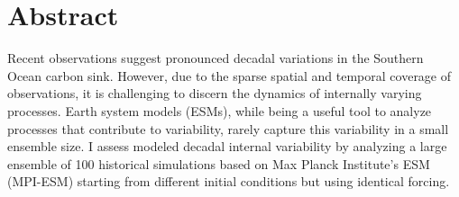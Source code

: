 
\chapter*{Abstract}
Recent observations suggest pronounced decadal variations in the Southern Ocean carbon sink. However, due to the sparse spatial and temporal coverage of observations, it is challenging to discern the dynamics of internally varying processes. Earth system models (ESMs), while being a useful tool to analyze processes that contribute to variability, rarely capture this variability in a small ensemble size. I assess modeled decadal internal variability by analyzing a large ensemble of 100 historical simulations based on Max Planck Institute's ESM (MPI-ESM) starting from different initial conditions but using identical forcing.


